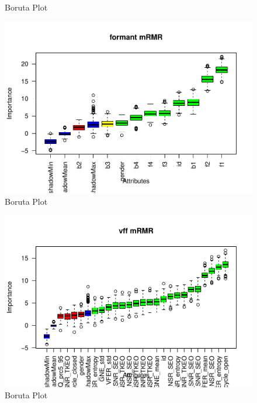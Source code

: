 \documentclass[
]{article}
\begin{document}
\begin{landscape}
\begin{figure}
{}

\caption{\label{fig:borutaPlot}Boruta Plot}\label{fig:borutaPlot-2}
\end{figure}
\begin{figure}

{\centering \includegraphics[width=1\linewidth,height=1\textheight]{figure/borutaPlot-3} 

}

\caption{\label{fig:borutaPlot}Boruta Plot}\label{fig:borutaPlot-3}
\end{figure}
\begin{figure}

{\centering \includegraphics[width=1\linewidth,height=1\textheight]{figure/borutaPlot-4} 

}

\caption{\label{fig:borutaPlot}Boruta Plot}\label{fig:borutaPlot-4}
\end{figure}
\begin{figure}


\end{figure}
\end{landscape}
\end{document}
